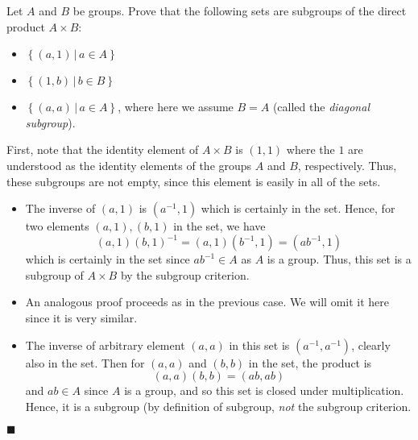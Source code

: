 \documentclass[12pt]{article}
\renewcommand{\qed}{\hfill$\blacksquare$}
\renewenvironment{proof}{\begin{addmargin}[1em]{0em}\begin{newproof}}{\end{newproof}\end{addmargin}\qed}
\newenvironment{problem}[2][Exercise]{\begin{trivlist}
\item[\hskip \labelsep {\bfseries #1}\hskip \labelsep {\bfseries #2.}]}{\end{trivlist}}
\begin{document}
\begin{problem}{1.2.11}
Let $A$ and $B$ be groups. Prove that the following sets are subgroups of the direct product $A\times B$:
\begin{itemize}
	\item $\left\{ \left(a,1\right)\, | \, a\in A\right\}$
	\item $\left\{ \left(1,b\right)\, | \, b\in B \right\}$
	\item $\left\{ \left(a,a\right)\, | \, a\in A \right\}$, where here we assume $B=A$ (called the \textit{diagonal subgroup}).
\end{itemize}
\end{problem}
\begin{proof}
First, note that the identity element of $A\times B$ is $\left(1,1\right)$ where the $1$ are understood as the identity elements of the groups $A$ and $B$, respectively. Thus, these subgroups are not empty, since this element is easily in all of the sets.
\begin{itemize}
	\item The inverse of $\left(a,1\right)$ is $\left(a^{-1},1\right)$ which is certainly in the set. Hence, for two elements $\left(a,1\right), \left(b,1\right)$ in the set, we have \[ \left(a,1\right)\left(b,1\right)^{-1} = \left(a,1\right)\left(b^{-1},1\right) = \left(ab^{-1},1\right) \] which is certainly in the set since $ab^{-1}\in A$ as $A$ is a group. Thus, this set is a subgroup of $A\times B$ by the subgroup criterion.
	\item An analogous proof proceeds as in the previous case. We will omit it here since it is very similar.
	\item The inverse of arbitrary element $\left(a,a\right)$ in this set is $\left(a^{-1},a^{-1}\right)$, clearly also in the set. Then for $\left(a,a\right)$ and $\left(b,b\right)$ in the set, the product is \[ \left(a,a\right)\left(b,b\right)=\left(ab,ab\right)\] and $ab\in A$ since $A$ is a group, and so this set is closed under multiplication. Hence, it is a subgroup (by definition of subgroup, \textit{not} the subgroup criterion.
\end{itemize}
\end{proof}
\end{document}
